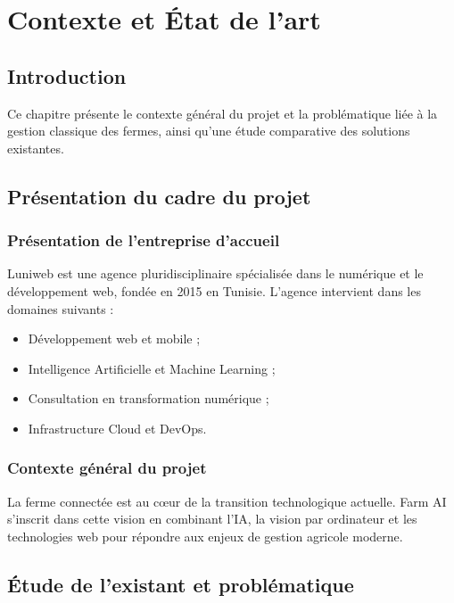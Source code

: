 \documentclass[12pt,a4paper]{report}
\numberwithin{figure}{chapter}
\numberwithin{table}{chapter}
\begin{document}
\chapter{Contexte et État de l'art}

\section{Introduction}
Ce chapitre présente le contexte général du projet et la problématique liée à la gestion classique
des fermes, ainsi qu'une étude comparative des solutions existantes.

\section{Présentation du cadre du projet}

\subsection{Présentation de l'entreprise d'accueil}
Luniweb est une agence pluridisciplinaire spécialisée dans le numérique et le développement web,
fondée en 2015 en Tunisie. L'agence intervient dans les domaines suivants :

\begin{itemize}
  \item Développement web et mobile ;
  \item Intelligence Artificielle et Machine Learning ;
  \item Consultation en transformation numérique ;
  \item Infrastructure Cloud et DevOps.
\end{itemize}

\subsection{Contexte général du projet}
La ferme connectée est au cœur de la transition technologique actuelle. Farm AI s'inscrit dans cette
vision en combinant l'IA, la vision par ordinateur et les technologies web pour répondre aux enjeux
de gestion agricole moderne.

\section{Étude de l'existant et problématique}
\end{document}
